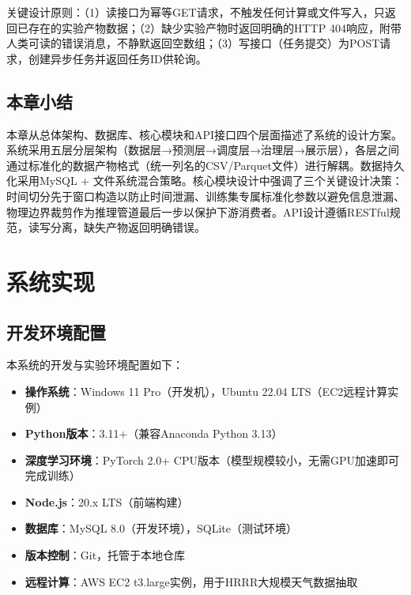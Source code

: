\documentclass[12pt,a4paper]{ctexbook}
\begin{document}
关键设计原则：（1）读接口为幂等GET请求，不触发任何计算或文件写入，只返回已存在的实验产物数据；（2）缺少实验产物时返回明确的HTTP 404响应，附带人类可读的错误消息，不静默返回空数组；（3）写接口（任务提交）为POST请求，创建异步任务并返回任务ID供轮询。

\section{本章小结}

本章从总体架构、数据库、核心模块和API接口四个层面描述了系统的设计方案。系统采用五层分层架构（数据层→预测层→调度层→治理层→展示层），各层之间通过标准化的数据产物格式（统一列名的CSV/Parquet文件）进行解耦。数据持久化采用MySQL + 文件系统混合策略。核心模块设计中强调了三个关键设计决策：时间切分先于窗口构造以防止时间泄漏、训练集专属标准化参数以避免信息泄漏、物理边界裁剪作为推理管道最后一步以保护下游消费者。API设计遵循RESTful规范，读写分离，缺失产物返回明确错误。\cite{design-patterns,fastapi}

\chapter{系统实现}

\section{开发环境配置}

本系统的开发与实验环境配置如下：

\begin{itemize}
  \item \textbf{操作系统}：Windows 11 Pro（开发机），Ubuntu 22.04 LTS（EC2远程计算实例）
  \item \textbf{Python版本}：3.11+（兼容Anaconda Python 3.13）
  \item \textbf{深度学习环境}：PyTorch 2.0+ CPU版本（模型规模较小，无需GPU加速即可完成训练）
  \item \textbf{Node.js}：20.x LTS（前端构建）
  \item \textbf{数据库}：MySQL 8.0（开发环境），SQLite（测试环境）
  \item \textbf{版本控制}：Git，托管于本地仓库
  \item \textbf{远程计算}：AWS EC2 t3.large实例，用于HRRR大规模天气数据抽取
\end{itemize}
\end{document}
